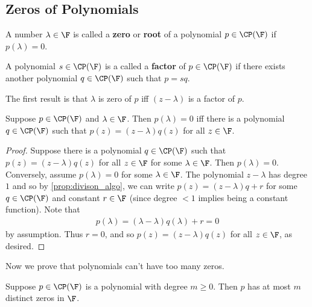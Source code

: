 \documentclass{article}
\begin{document}
\subsection{Zeros of Polynomials}
\begin{defn}
  A number $\lambda \in \F$ is called a \textbf{zero} or \textbf{root} of a polynomial $p \in \CP(\F)$ if $p(\lambda) = 0$.
\end{defn}
\begin{defn}
  A polynomial $s \in \CP(\F)$ is a called a \textbf{factor} of $p \in \CP(\F)$ if there exists another polynomial $q \in \CP(\F)$ such that $p = sq$.
\end{defn}
The first result is that $\lambda$ is zero of $p$ iff $(z - \lambda)$ is a factor of $p$.
\begin{prop}\label{prop:zero_equals_one_degree_factor}
  Suppose $p \in \CP(\F)$ and $\lambda \in \F$. Then $p(\lambda) = 0$ iff there is a polynomial $q \in \CP(\F)$ such that $p(z) = (z - \lambda)q(z)$ for all $z \in \F$.
\end{prop}
\begin{proof}
  Suppose there is a polynomial $q \in \CP(\F)$ such that $p(z) = (z - \lambda)q(z)$ for all $z \in \F$ for some $\lambda \in \F$. Then $p(\lambda) = 0$. Conversely, assume $p(\lambda) = 0$
  for some $\lambda \in \F$. The polynomial $z - \lambda$ has degree $1$ and so by \eqref{prop:divison_algo}, we can write $p(z) = (z - \lambda)q + r$ for some $q \in \CP(\F)$ and constant
  $r \in \F$ (since degree $< 1$ implies being a constant function). Note that 
  \begin{align*}
    p(\lambda) = (\lambda - \lambda)q(\lambda) + r = 0
  \end{align*}
  by assumption. Thus $r = 0$, and so $p(z) = (z - \lambda)q(z)$ for all $z \in \F$, as desired.
\end{proof}
Now we prove that polynomials can't have too many zeros.
\begin{prop}
  Suppose $p \in \CP(\F)$ is a polynomial with degree $m \geq 0$. Then $p$ has at most $m$ distinct zeros in $\F$.
\end{prop}
\end{document}
